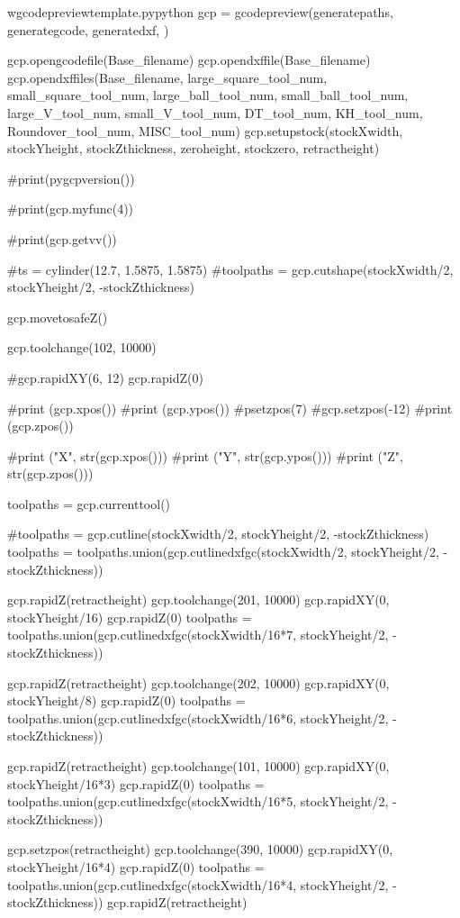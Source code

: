 \documentclass{ltxdoc}
\begin{document}
\begin{writecode}{w}{gcodepreviewtemplate.py}{python}
gcp = gcodepreview(generatepaths, 
                   generategcode, 
                   generatedxf, 
                   )

gcp.opengcodefile(Base_filename)
gcp.opendxffile(Base_filename)
gcp.opendxffiles(Base_filename, 
                 large_square_tool_num, 
                 small_square_tool_num, 
                 large_ball_tool_num, 
                 small_ball_tool_num, 
                 large_V_tool_num, 
                 small_V_tool_num, 
                 DT_tool_num, 
                 KH_tool_num, 
                 Roundover_tool_num, 
                 MISC_tool_num)
gcp.setupstock(stockXwidth, stockYheight, stockZthickness, zeroheight, stockzero, retractheight)

#print(pygcpversion())

#print(gcp.myfunc(4))

#print(gcp.getvv())

#ts = cylinder(12.7, 1.5875, 1.5875)
#toolpaths = gcp.cutshape(stockXwidth/2, stockYheight/2, -stockZthickness)

gcp.movetosafeZ()

gcp.toolchange(102, 10000)

#gcp.rapidXY(6, 12)
gcp.rapidZ(0)

#print (gcp.xpos())
#print (gcp.ypos())
#psetzpos(7)
#gcp.setzpos(-12)
#print (gcp.zpos())

#print ("X", str(gcp.xpos()))
#print ("Y", str(gcp.ypos()))
#print ("Z", str(gcp.zpos()))

toolpaths = gcp.currenttool()

#toolpaths = gcp.cutline(stockXwidth/2, stockYheight/2, -stockZthickness)
toolpaths = toolpaths.union(gcp.cutlinedxfgc(stockXwidth/2, stockYheight/2, -stockZthickness))

gcp.rapidZ(retractheight)
gcp.toolchange(201, 10000)
gcp.rapidXY(0, stockYheight/16)
gcp.rapidZ(0)
toolpaths = toolpaths.union(gcp.cutlinedxfgc(stockXwidth/16*7, stockYheight/2, -stockZthickness))

gcp.rapidZ(retractheight)
gcp.toolchange(202, 10000)
gcp.rapidXY(0, stockYheight/8)
gcp.rapidZ(0)
toolpaths = toolpaths.union(gcp.cutlinedxfgc(stockXwidth/16*6, stockYheight/2, -stockZthickness))

gcp.rapidZ(retractheight)
gcp.toolchange(101, 10000)
gcp.rapidXY(0, stockYheight/16*3)
gcp.rapidZ(0)
toolpaths = toolpaths.union(gcp.cutlinedxfgc(stockXwidth/16*5, stockYheight/2, -stockZthickness))

gcp.setzpos(retractheight)
gcp.toolchange(390, 10000)
gcp.rapidXY(0, stockYheight/16*4)
gcp.rapidZ(0)
toolpaths = toolpaths.union(gcp.cutlinedxfgc(stockXwidth/16*4, stockYheight/2, -stockZthickness))
gcp.rapidZ(retractheight)


\end{writecode}
\end{document}
